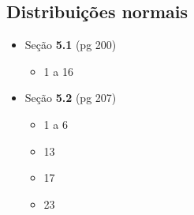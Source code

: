 \documentclass[a4paper]{article}
\begin{document}
\subsection{Distribuições normais}

\begin{itemize}
\item Seção {\bf 5.1} (pg 200)
  \begin{itemize}
  \item 1 a 16
  \end{itemize}
\item Seção {\bf 5.2} (pg 207)
  \begin{itemize}
  \item 1 a 6
  \item 13
  \item 17
  \item 23
  \end{itemize}
\end{itemize}
\end{document}
